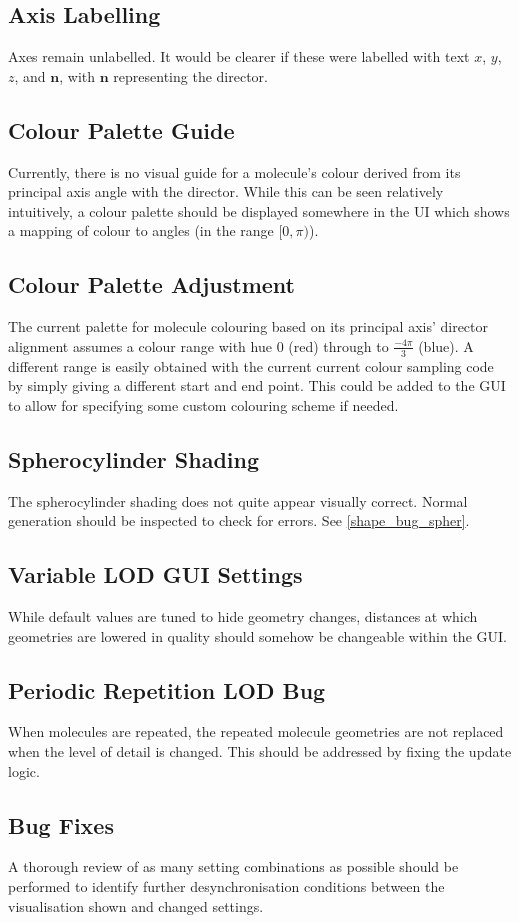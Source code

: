 \subsection{Axis Labelling}
Axes remain unlabelled. It would be clearer if these were labelled with text $x$, $y$, $z$, and $\mathbf{n}$, with $\mathbf{n}$ representing the director.

\subsection{Colour Palette Guide}
Currently, there is no visual guide for a molecule's colour derived from its principal axis angle with the director. While this can be seen relatively intuitively, a colour palette should be displayed somewhere in the UI which shows a mapping of colour to angles (in the range $[0, \pi)$).

\subsection{Colour Palette Adjustment}
The current palette for molecule colouring based on its principal axis' director alignment assumes a colour range with hue $0$ (red) through to $\frac{-4\pi}{3}$ (blue). A different range is easily obtained with the current current colour sampling code by simply giving a different start and end point. This could be added to the GUI to allow for specifying some custom colouring scheme if needed.

\subsection{Spherocylinder Shading}
The spherocylinder shading does not quite appear visually correct. Normal generation should be inspected to check for errors. See \cref{shape_bug_spher}.

\subsection{Variable LOD GUI Settings}
While default values are tuned to hide geometry changes, distances at which geometries are lowered in quality should somehow be changeable within the GUI.

\subsection{Periodic Repetition LOD Bug}
When molecules are repeated, the repeated molecule geometries are not replaced when the level of detail is changed. This should be addressed by fixing the update logic.

\subsection{Bug Fixes}
A thorough review of as many setting combinations as possible should be performed to identify further desynchronisation conditions between the visualisation shown and changed settings.
